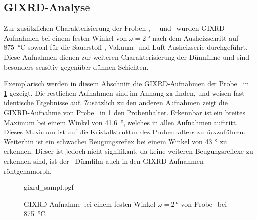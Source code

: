 \subsection{GIXRD-Analyse}\label{subsec:GIXRD}
Zur zusätzlichen Charakterisierung der Proben \samplethree, \sampleone\, \sampletwo\ und \samplefour\ wurden
GIXRD-Aufnahmen bei einem festen Winkel von $\omega=\qty{2}{\degree}$ nach dem Ausheizschritt auf
\qty{875}{\degreeCelsius} sowohl für die Sauerstoff-, Vakuum- und Luft-Ausheizserie durchgeführt.
Diese Aufnahmen dienen zur weiteren Charakterisierung der Dünnfilme und sind besonders sensitiv
gegenüber dünnen Schichten.

Exemplarisch werden in diesem Abschnitt die GIXRD-Aufnahmen der Probe \sampleone\ in \cref{fig:GIXRD_W6821} gezeigt.
Die restlichen Aufnahmen sind im Anhang zu finden, und weisen fast identische Ergebnisse auf.
Zusätzlich zu den anderen Aufnahmen zeigt die GIXRD-Aufnahme von Probe \sampleone\ in \cref{fig:GIXRD_W6821} den
Probenhalter.
Erkennbar ist ein breites Maximum bei einem Winkel von \qty{41.6}{\degree}, welches in allen Aufnahmen auftritt.
Dieses Maximum ist auf die Kristallstruktur des Probenhalters zurückzuführen.
Weiterhin ist ein schwacher Beugungsreflex bei einem Winkel von \qty{43}{\degree} zu erkennen.
Dieser ist jedoch nicht signifikant,
da keine weiteren Beugungsreflexe zu erkennen sind, ist der \heo\ Dünnfilm auch in den GIXRD-Aufnahmen röntgenamorph.
\begin{figure}
    \centering
    {gixrd_sampl.pgf}
    \caption{GIXRD-Aufnahme bei einem festen Winkel $\omega=\qty{2}{\degree}$ von Probe \sampleone\ bei
    \qty{875}{\degreeCelsius}.}
    \label{fig:GIXRD_W6821}
\end{figure}

